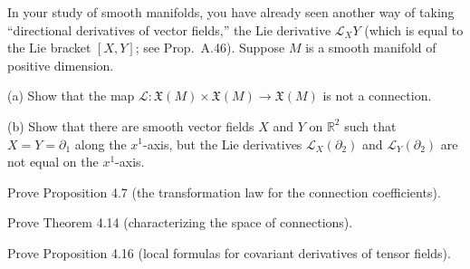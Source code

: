 \begin{exercise}\label{prob:lie-derivative-not-connection}
In your study of smooth manifolds, you have already seen another way of taking ``directional derivatives of vector fields,'' the Lie derivative $\mathcal{L}_X Y$ (which is equal to the Lie bracket $[X,Y]$; see Prop.~A.46). Suppose $M$ is a smooth manifold of positive dimension.

(a) Show that the map $\mathcal{L}: \mathfrak{X}(M) \times \mathfrak{X}(M) \to \mathfrak{X}(M)$ is not a connection.

(b) Show that there are smooth vector fields $X$ and $Y$ on $\mathbb{R}^2$ such that $X = Y = \partial_1$ along the $x^1$-axis, but the Lie derivatives $\mathcal{L}_X(\partial_2)$ and $\mathcal{L}_Y(\partial_2)$ are not equal on the $x^1$-axis.
\end{exercise}

\begin{exercise}\label{prob:transformation-law-connection}
\leanok
Prove Proposition 4.7 (the transformation law for the connection coefficients).
\end{exercise}

\begin{exercise}\label{prob:characterizing-connections}
Prove Theorem 4.14 (characterizing the space of connections).
\end{exercise}

\begin{exercise}\label{prob:tensor-field-formulas}
Prove Proposition 4.16 (local formulas for covariant derivatives of tensor fields).
\end{exercise}


